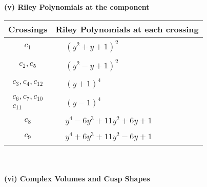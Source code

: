 \documentclass[1p]{elsarticle_modified}
\theoremstyle{definition}
\begin{document}
\newpage\renewcommand{\arraystretch}{1}
\flushleft \textbf{(v) Riley Polynomials at the component}\newline \\
\begin{tabular}{m{50pt}|m{274pt}}
Crossings & \hspace{64pt}Riley Polynomials at each crossing \\
\hline $$\begin{aligned}c_{1}\end{aligned}$$&$\begin{aligned}
&(y^2+y+1)^2
\end{aligned}$\\
\hline $$\begin{aligned}c_{2},c_{5}\end{aligned}$$&$\begin{aligned}
&(y^2- y+1)^2
\end{aligned}$\\
\hline $$\begin{aligned}c_{3},c_{4},c_{12}\end{aligned}$$&$\begin{aligned}
&(y+1)^4
\end{aligned}$\\
\hline $$\begin{aligned}c_{6},c_{7},c_{10}\\c_{11}\end{aligned}$$&$\begin{aligned}
&(y-1)^4
\end{aligned}$\\
\hline $$\begin{aligned}c_{8}\end{aligned}$$&$\begin{aligned}
&y^4-6 y^3+11 y^2+6 y+1
\end{aligned}$\\
\hline $$\begin{aligned}c_{9}\end{aligned}$$&$\begin{aligned}
&y^4+6 y^3+11 y^2-6 y+1
\end{aligned}$\\
\hline
\end{tabular}\\~\\
\newpage\flushleft \textbf{(vi) Complex Volumes and Cusp Shapes}
\end{document}
